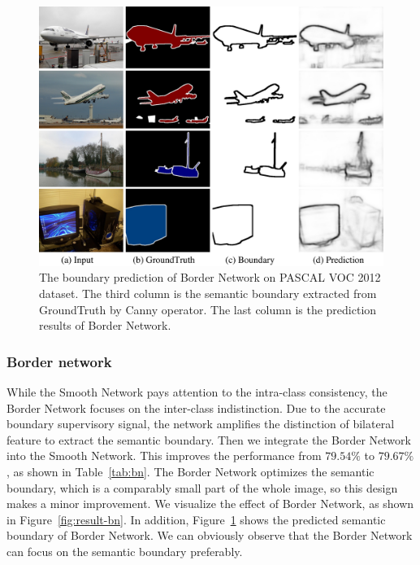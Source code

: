 \documentclass[10pt,twocolumn,letterpaper]{article}
\begin{document}
\begin{figure}[t]
\centering
\includegraphics[width=\linewidth]{res-bn-edge.pdf}
\caption{The boundary prediction of Border Network on PASCAL VOC 2012 dataset. The third column is the semantic boundary extracted from GroundTruth by Canny operator. The last column is the prediction results of Border Network.}
\label{fig:result-bn-edge}
\end{figure}

\subsubsection{Border network}
While the Smooth Network pays attention to the intra-class consistency, the Border Network focuses on the inter-class indistinction. Due to the accurate boundary supervisory signal, the network amplifies the distinction of bilateral feature to extract the semantic boundary. Then we integrate the Border Network into the Smooth Network. This improves the performance from $79.54\%$ to $79.67\%$, as shown in Table~\ref{tab:bn}. The Border Network optimizes the semantic boundary, which is a comparably small part of the whole image, so this design makes a minor improvement. We visualize the effect of Border Network, as shown in Figure~\ref{fig:result-bn}. In addition, Figure~\ref{fig:result-bn-edge} shows the predicted semantic boundary of Border Network. We can obviously observe that the Border Network can focus on the semantic boundary preferably. 
\end{document}
